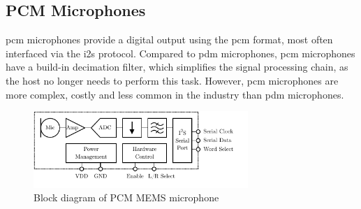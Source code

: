 \subsection{PCM Microphones} \label{sec:pcm_microphones}
\acrshort{pcm} microphones provide a digital output using the \acrlong{pcm} format, most often interfaced via the \acrshort{i2s} protocol.
Compared to \acrshort{pdm} microphones, \acrshort{pcm} microphones have a build-in decimation filter, which simplifies the signal processing chain, as the host no longer needs to perform this task.
However, \acrshort{pcm} microphones are more complex, costly and less common in the industry than \acrshort{pdm} microphones.
\begin{figure}[h!]
	\centering
	\vspace{-0.1cm}
	\includegraphics[height=2.9cm, trim={0 0.4cm 0 0}]{images/2_preliminaries/mems_microphone_types_pcm.pdf}
	\caption{Block diagram of PCM MEMS microphone}
	\label{fig:mems_microphone_types_pcm}
\end{figure}
\clearpage

